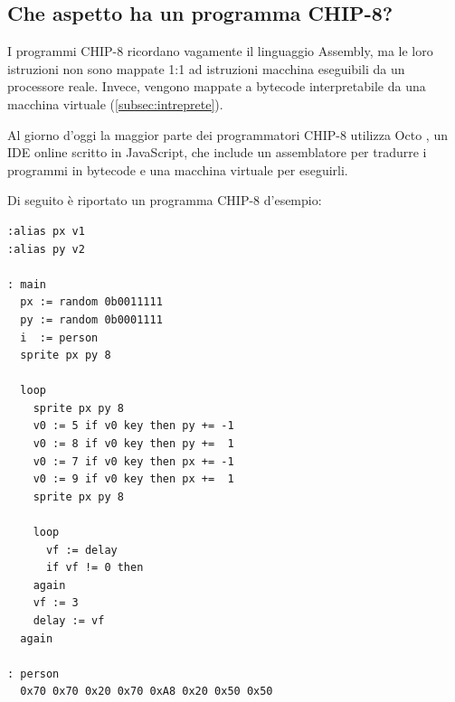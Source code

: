 \documentclass[a4paper]{article}
\begin{document}
\begin{appendices}
\section{Che aspetto ha un programma CHIP-8?}

I programmi CHIP-8 ricordano vagamente il linguaggio Assembly, ma le loro istruzioni non
sono mappate 1:1 ad istruzioni macchina eseguibili da un processore reale. Invece, vengono
mappate a bytecode interpretabile da una macchina virtuale (\ref{subsec:intreprete}).

Al giorno d'oggi la maggior parte dei programmatori CHIP-8 utilizza Octo \cite{chip8:octo}, un IDE
online scritto in JavaScript, che include un assemblatore per tradurre i programmi in bytecode
e una macchina virtuale per eseguirli.

Di seguito è riportato un programma CHIP-8 d'esempio:

\begin{lstlisting}[language=CHIP8]
:alias px v1
:alias py v2

: main
  px := random 0b0011111
  py := random 0b0001111
  i  := person
  sprite px py 8

  loop
    sprite px py 8
    v0 := 5 if v0 key then py += -1
    v0 := 8 if v0 key then py +=  1
    v0 := 7 if v0 key then px += -1
    v0 := 9 if v0 key then px +=  1
    sprite px py 8

    loop
      vf := delay
      if vf != 0 then
    again
    vf := 3
    delay := vf
  again

: person
  0x70 0x70 0x20 0x70 0xA8 0x20 0x50 0x50
\end{lstlisting}

\end{appendices}
\end{document}
